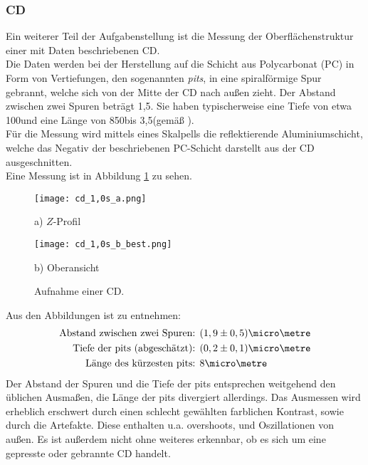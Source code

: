 \subsubsection{CD}
Ein weiterer Teil der Aufgabenstellung ist die Messung der Oberflächenstruktur einer mit Daten beschriebenen CD.\\
Die Daten werden bei der Herstellung auf die Schicht aus Polycarbonat (PC) in Form von Vertiefungen, den sogenannten \emph{pits}, in eine spiralförmige Spur gebrannt, welche sich von der Mitte der CD nach außen zieht. Der Abstand zwischen zwei Spuren beträgt 1,5\micro\metre . Sie haben typischerweise eine Tiefe von etwa 100\nano\metre und eine Länge von 850\nano\metre bis 3,5\micro\metre (gemäß \cite{lit:wiki_cd}).\\
Für die Messung wird mittels eines Skalpells die reflektierende Aluminiumschicht, welche das Negativ der beschriebenen PC-Schicht darstellt aus der CD ausgeschnitten.\\
Eine Messung ist in Abbildung \ref{fig:CD} zu sehen.
\begin{figure}[h]
\centering
	\begin{minipage}{0.45\textwidth}
	\centering
		\texttt{[image: cd\_1,0s\_a.png]}
		\caption*{a) $Z$-Profil}
	\end{minipage}
	\hfill
	\begin{minipage}{0.45\textwidth}
	\centering
		\texttt{[image: cd\_1,0s\_b\_best.png]}
		\caption*{b) Oberansicht}
	\end{minipage}
	\caption{Aufnahme einer CD.}
	\label{fig:CD}
\end{figure}
Aus den Abbildungen ist zu entnehmen:
\begin{align*}
\text{Abstand zwischen zwei Spuren: }& (1,9\pm0,5)\micro\metre\\
\text{Tiefe der pits (abgeschätzt): }& (0,2\pm0,1)\micro\metre\\
\text{Länge des kürzesten pits: }& 8\micro\metre 
\end{align*}
Der Abstand der Spuren und die Tiefe der pits entsprechen weitgehend den üblichen Ausmaßen, die Länge der pits divergiert allerdings. Das Ausmessen wird erheblich erschwert durch einen schlecht gewählten farblichen Kontrast, sowie durch die Artefakte. Diese enthalten u.a. overshoots, und Oszillationen von außen. Es ist außerdem nicht ohne weiteres erkennbar, ob es sich um eine gepresste oder gebrannte CD handelt.
